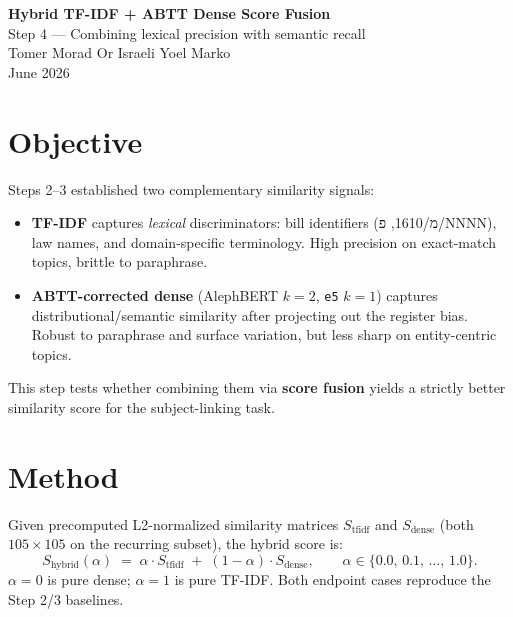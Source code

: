 \documentclass[11pt,a4paper]{article}
\begin{document}
\begin{center}
  {\LARGE \textbf{Hybrid TF-IDF + ABTT Dense Score Fusion}}\\[0.3em]
  {\large Step 4 --- Combining lexical precision with semantic recall}\\[0.6em]
  {\normalsize Tomer Morad \quad Or Israeli \quad Yoel Marko}\\
  {\normalsize June 2026}
\end{center}

\vspace{0.5em}

\section{Objective}

Steps 2--3 established two complementary similarity signals:
\begin{itemize}[noitemsep]
  \item \textbf{TF-IDF} captures \emph{lexical} discriminators: bill identifiers
        (\texthebrew{מ/1610}, \texthebrew{פ/NNNN}), law names, and domain-specific terminology.
        High precision on exact-match topics, brittle to paraphrase.
  \item \textbf{ABTT-corrected dense} (AlephBERT $k=2$, \texttt{e5} $k=1$) captures
        distributional/semantic similarity after projecting out the register bias.
        Robust to paraphrase and surface variation, but less sharp on entity-centric topics.
\end{itemize}

This step tests whether combining them via \textbf{score fusion} yields a strictly better
similarity score for the subject-linking task.

\section{Method}

Given precomputed L2-normalized similarity matrices $S_\text{tfidf}$ and $S_\text{dense}$
(both $105 \times 105$ on the recurring subset), the hybrid score is:
\[
  S_\text{hybrid}(\alpha) \;=\; \alpha \cdot S_\text{tfidf} \;+\; (1-\alpha) \cdot S_\text{dense},
  \qquad \alpha \in \{0.0,\, 0.1,\, \ldots,\, 1.0\}.
\]
$\alpha = 0$ is pure dense; $\alpha = 1$ is pure TF-IDF.  Both endpoint cases
reproduce the Step 2/3 baselines.
\end{document}
